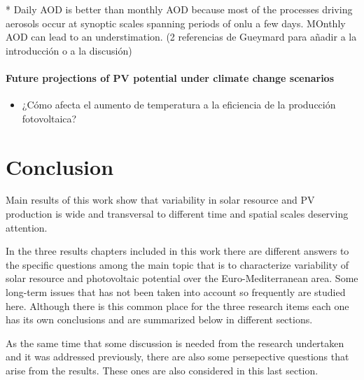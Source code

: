 * Daily AOD is better than monthly AOD because most of the processes driving aerosols occur at synoptic scales spanning periods of onlu a few days. MOnthly AOD can lead to an understimation. (2 referencias de Gueymard para añadir a la introducción o a la discusión)

\subsubsection{Future projections of PV potential under climate change scenarios}

\begin{itemize}
\item ¿Cómo afecta el aumento de temperatura a la eficiencia de la producción fotovoltaica?
\end{itemize}

\chapter{Conclusion\label{Conclusion}}

Main results of this work show that variability in solar resource and PV production is wide and transversal to different time and spatial scales deserving attention.  

In the three results chapters included in this work there are different answers to the specific questions among the main topic that is to characterize variability of solar resource and photovoltaic potential over the Euro-Mediterranean area. Some long-term issues that has not been taken into account so frequently are studied here. Although there is this common place for the three research items each one has its own conclusions and are summarized below in different sections.

As the same time that some discussion is needed from the research undertaken and it was addressed previously, there are also some persepective questions that arise from the results. These ones are also considered in this last section.



